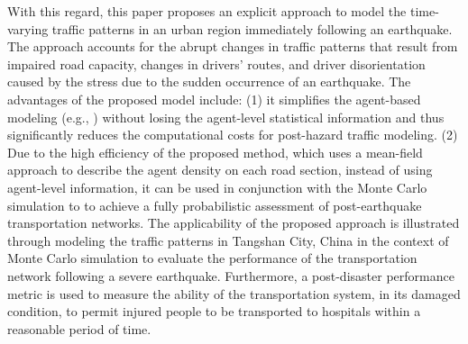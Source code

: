 \documentclass[review,11pt,nonatbib]{elsarticle}
\begin{document}
With this regard, this paper proposes an explicit approach to model the time-varying traffic patterns in an urban region immediately following an earthquake. The approach accounts for the abrupt changes in traffic patterns that result from impaired road capacity, changes in drivers' routes, and driver disorientation caused by the stress due to the sudden occurrence of an earthquake. The advantages of the proposed model include: (1) it simplifies the agent-based modeling (e.g., \citet{feng2017post}) without losing the agent-level statistical information and thus significantly reduces the computational costs for post-hazard traffic modeling. (2) Due to the high efficiency of the proposed method, which uses a mean-field approach to describe the agent density on each road section, instead of using agent-level information, it can be used in conjunction with  the Monte Carlo simulation to to achieve a fully probabilistic assessment of post-earthquake transportation networks. The applicability of the proposed approach is illustrated through modeling the traffic patterns in Tangshan City, China in the context of Monte Carlo simulation to evaluate the performance of the transportation network following a severe earthquake. Furthermore, a post-disaster performance metric is used to measure the ability of the transportation system, in its damaged condition, to permit injured people to be transported to hospitals within a reasonable period of time.
\end{document}
